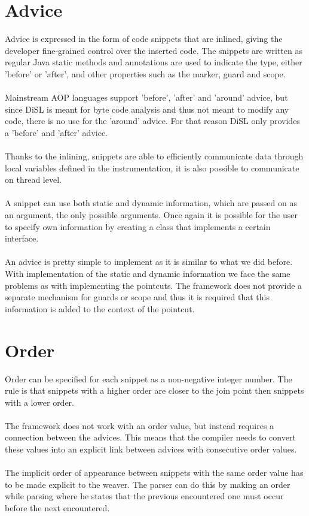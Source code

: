 \documentclass[a4paper]{report}
\begin{document}
\section{Advice}
Advice is expressed in the form of code snippets that are inlined, giving the developer fine-grained control over the inserted code. The snippets are written as regular Java static methods and annotations are used to indicate the type, either 'before' or 'after', and other properties such as the marker, guard and scope.\\
\\
Mainstream AOP languages support 'before', 'after' and 'around' advice, but since DiSL is meant for byte code analysis and thus not meant to modify any code, there is no use for the 'around' advice. For that reason DiSL only provides a 'before' and 'after' advice.\\
\\
Thanks to the inlining, snippets are able to efficiently communicate data through local variables defined in the instrumentation, it is also possible to communicate on thread level.\\
\\
A snippet can use both static and dynamic information, which are passed on as an argument, the only possible arguments. Once again it is possible for the user to specify own information by creating a class that implements a certain interface.\\
\\
An advice is pretty simple to implement as it is similar to what we did before. With implementation of the static and dynamic information we face the same problems as with implementing the pointcuts. The framework does not provide a separate mechanism for guards or scope and thus it is required that this information is added to the context of the pointcut.

\section{Order}
Order can be specified for each snippet as a non-negative integer number. The rule is that snippets with a higher order are closer to the join point then snippets with a lower order.\\
\\
The framework does not work with an order value, but instead requires a connection between the advices. This means that the compiler needs to convert these values into an explicit link between advices with consecutive order values.\\
\\
The implicit order of appearance between snippets with the same order value has to be made explicit to the weaver. The parser can do this by making an order while parsing where he states that the previous encountered one must occur before the next encountered.
\end{document}
